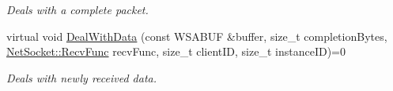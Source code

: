 \begin{DoxyCompactItemize}
\begin{DoxyCompactList}\small\item\em Deals with a complete packet. \item\end{DoxyCompactList}\item 
virtual void \hyperlink{class_net_mode_a075020ac61bedee59eb7b0dcb6754847}{DealWithData} (const WSABUF \&buffer, size\_\-t completionBytes, \hyperlink{class_net_socket_a52b5f4de8d0a47fd8620f542b21c076c}{NetSocket::RecvFunc} recvFunc, size\_\-t clientID, size\_\-t instanceID)=0
\begin{DoxyCompactList}\small\item\em Deals with newly received data. \item\end{DoxyCompactList}\end{DoxyCompactItemize}
